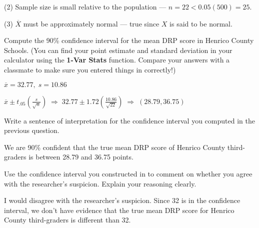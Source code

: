 \documentclass[noanswers]{exam}
\newcommand{\tc}[1]{\textcolor{purp}{#1}}
\begin{document}
\begin{questions}
\begin{solution}[\stretch{1}]
        (2) Sample size is small relative to the population --- $n=22<0.05(500)=25$.
        
        \vspace{3mm}
        
        \tc{(3) $\overline{X}$ must be approximately normal --- true since $X$ is said to be normal.}

\end{solution}

\question Compute the 90\% confidence interval for the mean DRP score in Henrico County Schools. (You can find your point estimate and standard deviation in your calculator using the \textbf{1-Var Stats} function. Compare your answers with a classmate to make sure you entered things in correctly!)

\begin{solution}[\stretch{1}]
$\overline{x}=32.77,\; s=10.86$
        
        \vspace{2mm}
        
        $\overline{x}\pm t_{.05}\left(\frac{s}{\sqrt{n}}\right) \;\Rightarrow\; 32.77\pm 1.72\left(\frac{10.86}{\sqrt{22}}\right) \;\Rightarrow\; (28.79,36.75)$

\end{solution}

\question Write a sentence of interpretation for the confidence interval you computed in the previous question.

\begin{solution}[\stretch{1}]

We are 90\% confident that the true mean DRP score of Henrico County third-graders is between 28.79 and 36.75 points.

\end{solution}

\question Use the confidence interval you constructed in to comment on whether you agree with the researcher's suspicion. Explain your reasoning clearly.

\begin{solution}[\stretch{1}]


I would disagree with the researcher's suspicion. Since 32 is in the confidence interval, we don't have evidence that the true mean DRP score for Henrico County third-graders is different than 32.
\end{solution}


\end{questions}
\end{document}
